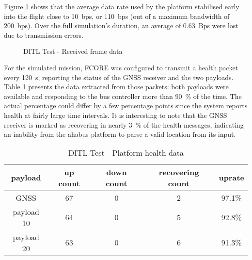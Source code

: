 Figure \ref{fig:ditl-bandwidth} shows that the average data rate used by the
platform stabilised early into the flight close to \SI{10}{bps}, or
\SI{110}{bps} (out of a maximum bandwidth of \SI{200}{bps}). Over the full
simulation's duration, an average of \SI{0.63}{Bps} were lost due to
transmission errors.

\begin{figure}[H]
\centering
\caption{DITL Test - Received frame data}
\label{fig:ditl-bandwidth}
\end{figure}

For the simulated mission, FCORE was configured to transmit a health packet
every \SI{120}{\second}, reporting the status of the GNSS receiver and the
two payloads. Table \ref{tab:ditl-health} presents the data extracted from those
packets: both payloads were available and responding to the bus controller more
than \SI{90}{\percent} of the time. The actual percentage could differ by a few
percentage points since the system reports health at fairly large time
intervals. It is interesting to note that the GNSS receiver is marked as
recovering in nearly \SI{3}{\percent} of the health messages, indicating an
inability from the \acrshort{ahabus} platform to parse a valid location from
its input.

\begin{table}[H]
\begin{center}
\begin{tabular}{ |c|c c c c| }
\hline
payload & up count & down count & recovering count & uprate \\
\hline
GNSS       & 67 & 0 & 2 & 97.1\% \\
payload 10 & 64 & 0 & 5 & 92.8\% \\
payload 20 & 63 & 0 & 6 & 91.3\% \\
\hline 
\end{tabular}
\end{center}
\caption {DITL Test - Platform health data}
\label{tab:ditl-health}
\end{table}

